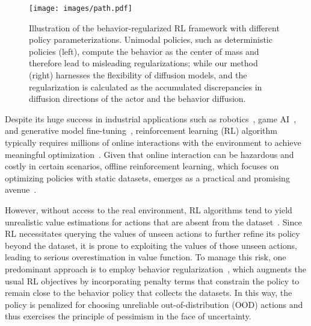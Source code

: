 
\begin{figure}
    \centering
    \texttt{[image: images/path.pdf]}
    \caption{Illustration of the behavior-regularized RL framework with different policy parameterizations. Unimodal policies, such as deterministic policies (left), compute the behavior as the center of mass and therefore lead to misleading regularizations; while our method (right) harnesses the flexibility of diffusion models, and the regularization is calculated as the accumulated discrepancies in diffusion directions of the actor and the behavior diffusion. }
    \label{fig:intro_policy}
\end{figure}

Despite its huge success in industrial applications such as robotics~\citep{robotics}, game AI~\citep{alphastar}, and generative model fine-tuning~\citep{instruct_gpt}, reinforcement learning (RL) algorithm typically requires millions of online interactions with the environment to achieve meaningful optimization~\citep{sac,ppo}. Given that online interaction can be hazardous and costly in certain scenarios, offline reinforcement learning, which focuses on optimizing policies with static datasets, emerges as a practical and promising avenue~\citep{levine_survey}. 

However, without access to the real environment, RL algorithms tend to yield unrealistic value estimations for actions that are absent from the dataset~\citep{levine_survey,td3bc}. Since RL necessitates querying the values of unseen actions to further refine its policy beyond the dataset, it is prone to exploiting the values of those unseen actions, leading to serious overestimation in value function. To manage this risk, one predominant approach is to employ behavior regularization~\citep{bcq,bear,brac,rebrac}, which augments the usual RL objectives by incorporating penalty terms that constrain the policy to remain close to the behavior policy that collects the datasets. In this way, the policy is penalized for choosing unreliable out-of-distribution (OOD) actions and thus exercises the principle of pessimism in the face of uncertainty. 

